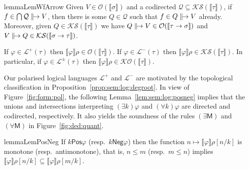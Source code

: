 \documentclass[%
  a4paper,
  UKenglish,
  cleveref,
  autoref,
  thm-restate,
  numberwithinsect,
]{lipics-v2021}
\newcommand\sle\subseteq
\newcommand\I[1]{\llbracket #1 \rrbracket} %
\newcommand\ax[1]{(\mathsf{#1})}
\newcommand\Open{\mathcal{O}}		%
\newcommand\K{\mathcal{K}}		%
\newcommand\Sat{\mathcal{S}}		%
\newcommand\val{\rho}	%
\newcommand\term[1]{\mathsf{#1}}
\newcommand\arrow\to
\newcommand\defrealto{\mathrel\parallel\joinrel\to}
\newcommand\realto{\mathrel{\defrealto}}
\newcommand\PT{\tau}		%
\newcommand\PTbis{\sigma}	%
\newcommand\itvar{k}
\newcommand\Pos{\mathrel{\term{Pos}}}
\newcommand\Neg{\mathrel{\term{Neg}}}
\newcommand\Lang{\mathcal{L}}
\begin{document}
\begin{restatable}{lemma}{LemWfArrow}
\label{lem:sem:log:realto}
Given $V \in \Open(\I\PTbis)$
and a codirected $\mathcal{Q} \sle \K\Sat(\I\PT)$,
if $f \in \bigcap\mathcal{Q} \realto V$,
then there is some $Q \in \mathcal{Q}$
such that $f \in Q \realto V$ already.
%
Moreover, given $Q \in \K\Sat(\I\PT)$ we have
$Q \realto V \in \Open(\I{\PT \arrow \PTbis})$
and
$V \realto Q \in \K\Sat(\I{\PTbis \arrow \PT})$.
\end{restatable}

\begin{proposition}[restate = PropFormdeGroot, name = ]
\label{prop:sem:log:degroot}
If $\varphi \in \Lang^+(\PT)$
then
$\I\varphi\val \in \Open(\I\PT)$.
If $\varphi \in \Lang^-(\PT)$
then
$\I\varphi\val \in \K\Sat(\I\PT)$.
In particular,
if $\varphi \in \Lang^\pm(\PT)$
then
$\I\varphi\val \in \K\Open(\I\PT)$.
\end{proposition}


Our polarised logical languages $\Lang^+$ and $\Lang^-$
are motivated by the topological classification in
Proposition~\ref{prop:sem:log:degroot}.
%
In view of Figure~\ref{fig:form:pol},
the following Lemma~\ref{lem:sem:log:posneg} implies
that the unions and intersections interpreting
$(\exists \itvar)\varphi$ and $(\forall \itvar)\varphi$
are directed and codirected, respectively.
It also yields the soundness of the 
rules $\ax{\exists M}$ and $\ax{\forall M}$
in Figure~\ref{fig:ded:quant}.

\begin{restatable}{lemma}{LemPosNeg}
\label{lem:sem:log:posneg}
If $\itvar \Pos \varphi$
(resp.\ $\itvar \Neg \varphi$)
then the function
$n \mapsto \I\varphi\val[n/\itvar]$
is monotone (resp.\ antimonotone),
that is, $n \leq m$ (resp.\ $m \leq n$)
implies
$\I\varphi\val[n / \itvar] \sle \I\varphi\val[m / \itvar]$.
\end{restatable}
\end{document}

